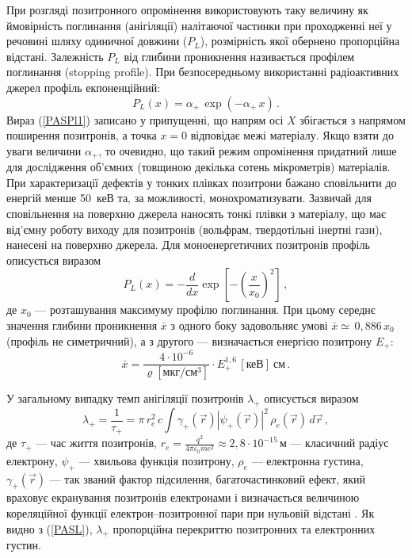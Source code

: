 При розгляді позитронного опромінення використовують
таку величину як ймовірність поглинання (анігіляції) налітаючої частинки
при проходженні неї у речовині шляху одиничної довжини ($P_L$),
розмірність якої обернено пропорційна відстані.
Залежність $P_L$ від глибини проникнення називається профілем поглинання (stopping profile).
При безпосередньому використанні радіоактивних джерел профіль екпоненційний:
\begin{equation}\label{PASPl1}
P_L(x)=\alpha_+\,\exp(-\alpha_+\,x)\,.
\end{equation}
Вираз (\ref{PASPl1}) записано у припущенні, що
напрям осі $X$ збігається з напрямом поширення позитронів,
а точка $x=0$ відповідає межі матеріалу.
Якщо взяти до уваги величини $\alpha_+$, то очевидно,
що такий режим опромінення придатний лише для дослідження об'ємних
(товщиною декілька сотень мікрометрів) матеріалів.
При характеризації дефектів у тонких плівках позитрони
бажано сповільнити до енергій менше 50~кеВ та, за можливості, монохроматизувати.
Зазвичай для сповільнення на поверхню джерела наносять тонкі плівки з матеріалу, що має
від'ємну роботу виходу для позитронів (вольфрам, твердотільні інертні гази), нанесені на поверхню джерела.
Для моноенергетичних позитронів профіль описується виразом
\begin{equation}\label{PASPl2}
P_L(x)=-\frac{d}{dx}\exp\left[-\left(\frac{x}{x_0}\right)^2\right]\,,
\end{equation}
де
$x_0$ --- розташування максимуму профілю поглинання.
При цьому середнє значення глибини проникнення $\bar{x}$  з одного боку
задовольняє умові $\bar{x}\simeq \,0,886\, x_0$ (профіль не симетричний),
а з другого --- визначається енергією позитрону $E_{+}$:
\begin{equation}
\bar{x}=\frac{4\cdot10^{-6}}{\varrho\left[\text{мкг}/\text{см}^3\right]}\cdot E_{+}^{1,6}\,[\text{кеВ}]\:\text{см}\,.
\end{equation}

У загальному випадку темп анігіляції позитронів $\lambda_+$ описується виразом
\begin{equation}\label{PASL}
\lambda_+=\frac{1}{\tau_+}=\pi\,r_e^2\,c\int\gamma_+(\overrightarrow{r})\left|\psi_+(\overrightarrow{r})\right|^2\,\rho_e(\overrightarrow{r})\,d\overrightarrow{r}\,,
\end{equation}
де
$\tau_+$ --- час життя позитронів,
$r_e=\frac{q^2}{4\pi\varepsilon_0 m c^2}\approx2,8\cdot10^{-15}\,\text{м}$ --- класичний радіус електрону,
$\psi_+$ --- хвильова функція позитрону,
$\rho_e$ --- електронна густина,
$\gamma_+(\overrightarrow{r})$ --- так званий фактор підсилення, багаточастинковий ефект,
який враховує екранування позитронів електронами і визначається величиною
кореляційної функції електрон--позитронної пари при нульовій відстані \cite{tuomisto2019}.
Як видно з (\ref{PASL}), $\lambda_+$ пропорційна перекриттю позитронних та електронних густин.

